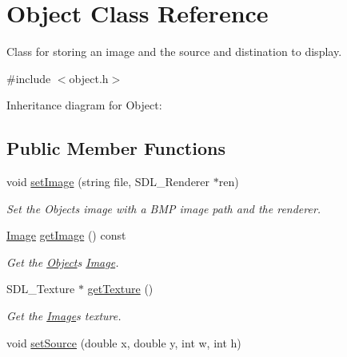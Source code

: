 \hypertarget{classObject}{}\section{Object Class Reference}
\label{classObject}


Class for storing an image and the source and distination to display.  




{\ttfamily \#include $<$object.\+h$>$}



Inheritance diagram for Object\+:
\subsection*{Public Member Functions}
\begin{DoxyCompactItemize}
\item 
void \hyperlink{classObject_a7f984ff2fb0c60b942a1018fc48417ae}{set\+Image} (string file, S\+D\+L\+\_\+\+Renderer $\ast$ren)\hypertarget{classObject_a7f984ff2fb0c60b942a1018fc48417ae}{}\label{classObject_a7f984ff2fb0c60b942a1018fc48417ae}

\begin{DoxyCompactList}\small\item\em Set the Objects image with a B\+MP image path and the renderer. \end{DoxyCompactList}\item 
\hyperlink{classImage}{Image} \hyperlink{classObject_a76748c591087e0a3c676daea6f257e08}{get\+Image} () const \hypertarget{classObject_a76748c591087e0a3c676daea6f257e08}{}\label{classObject_a76748c591087e0a3c676daea6f257e08}

\begin{DoxyCompactList}\small\item\em Get the \hyperlink{classObject}{Object}\textquotesingle{}s \hyperlink{classImage}{Image}. \end{DoxyCompactList}\item 
S\+D\+L\+\_\+\+Texture $\ast$ \hyperlink{classObject_af8ae0f74940285c54e90f19027bba3a7}{get\+Texture} ()\hypertarget{classObject_af8ae0f74940285c54e90f19027bba3a7}{}\label{classObject_af8ae0f74940285c54e90f19027bba3a7}

\begin{DoxyCompactList}\small\item\em Get the \hyperlink{classImage}{Image}\textquotesingle{}s texture. \end{DoxyCompactList}\item 
void \hyperlink{classObject_a094e6dc25b31cfac9d745869a878bd8b}{set\+Source} (double x, double y, int w, int h)\hypertarget{classObject_a094e6dc25b31cfac9d745869a878bd8b}{}\label{classObject_a094e6dc25b31cfac9d745869a878bd8b}


\end{DoxyCompactItemize}
